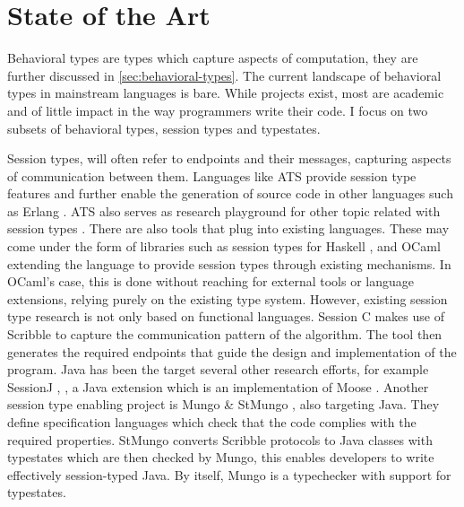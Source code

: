 \section{State of the Art}\label{sec:state-of-the-art}

Behavioral types are types which capture aspects of computation, they are further discussed in \autoref{sec:behavioral-types}.
The current landscape of behavioral types in mainstream languages is bare.
While projects exist, most are academic and of little impact in the way programmers write their code.
I focus on two subsets of behavioral types, session types and typestates.

Session types, will often refer to endpoints and their messages, capturing aspects of communication between them.
Languages like ATS provide session type features and further enable the generation of source code in other languages
such as Erlang \autocite{Xi2016}. ATS also serves as research playground for other topic related with session types \autocite{Xi2016a}.
There are also tools that plug into existing languages.
These may come under the form of libraries such as session types
for Haskell \autocite[Section 3.3]{Ancona2016}, \autocite[Chapter 10]{Gay2017} and OCaml \autocite[Chapter 11]{Gay2017}
extending the language to provide session types through existing mechanisms.
In OCaml's case, this is done without reaching for external tools or language extensions,
relying purely on the existing type system.
However, existing session type research is not only based on functional languages.
Session C \autocite[Section 4.1]{Ancona2016} makes use of Scribble \autocite{Yoshida2014} to capture the communication pattern of the algorithm.
The tool then generates the required endpoints that guide the design and implementation of the program.
Java has been the target several other research efforts, for example SessionJ \autocite[Section 2.2.1]{Ancona2016}, \autocite{Hu2008},
a Java extension which is an implementation of Moose \autocite[Section 2.1.1]{Ancona2016}.
Another session type enabling project is Mungo \& StMungo \autocite{Kouzapas2018, Voinea2020}, also targeting Java.
They define specification languages which check that the code complies with the required properties.
StMungo converts Scribble protocols to Java classes with typestates which are then checked by Mungo,
this enables developers to write effectively session-typed Java.
By itself, Mungo is a typechecker with support for typestates.


